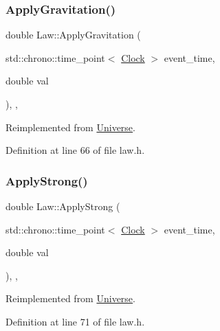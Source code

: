 \subsubsection{\texorpdfstring{Apply\+Gravitation()}{ApplyGravitation()}}
{\footnotesize\ttfamily double Law\+::\+Apply\+Gravitation (\begin{DoxyParamCaption}\item[{std\+::chrono\+::time\+\_\+point$<$ \hyperlink{universe_8h_a0ef8d951d1ca5ab3cfaf7ab4c7a6fd80}{Clock} $>$}]{event\+\_\+time,  }\item[{double}]{val }\end{DoxyParamCaption})\hspace{0.3cm}{\ttfamily [inline]}, {\ttfamily [final]}, {\ttfamily [virtual]}}



Reimplemented from \hyperlink{class_universe_a76c0b5e63c2a7d1988c44db341c3d64c}{Universe}.



Definition at line 66 of file law.\+h.

\mbox{\label{class_law_ab38659b209055df7e59f4bcd1b9e545a}} 
\subsubsection{\texorpdfstring{Apply\+Strong()}{ApplyStrong()}}
{\footnotesize\ttfamily double Law\+::\+Apply\+Strong (\begin{DoxyParamCaption}\item[{std\+::chrono\+::time\+\_\+point$<$ \hyperlink{universe_8h_a0ef8d951d1ca5ab3cfaf7ab4c7a6fd80}{Clock} $>$}]{event\+\_\+time,  }\item[{double}]{val }\end{DoxyParamCaption})\hspace{0.3cm}{\ttfamily [inline]}, {\ttfamily [final]}, {\ttfamily [virtual]}}



Reimplemented from \hyperlink{class_universe_a906a88b37f10bfa630bef49dfd0e907a}{Universe}.



Definition at line 71 of file law.\+h.

\mbox{\label{class_law_a57d05f26e1c0ee953260ebd3780248f8}} 
